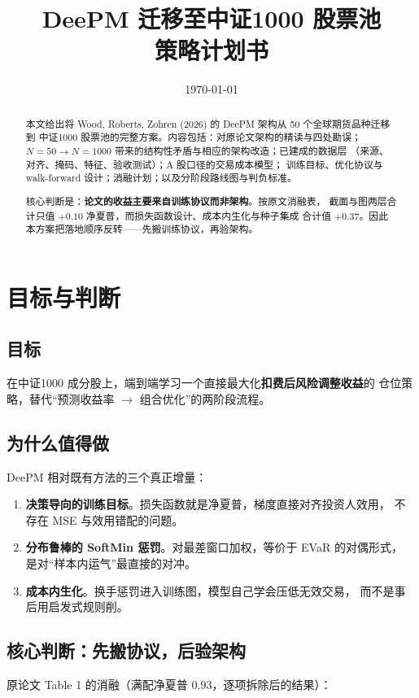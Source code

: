 \documentclass[11pt, a4paper]{ctexart}
\title{\bfseries DeePM 迁移至中证1000 股票池\\[4pt] \large 策略计划书}
\author{}
\date{\today}
\begin{document}
\maketitle
\thispagestyle{fancy}

\begin{abstract}
\noindent
本文给出将 Wood, Roberts, Zohren (2026) 的 DeePM 架构从 50 个全球期货品种迁移到
中证1000 股票池的完整方案。内容包括：对原论文架构的精读与四处勘误；
$N{=}50 \to N{=}1000$ 带来的结构性矛盾与相应的架构改造；已建成的数据层
（来源、对齐、掩码、特征、验收测试）；A 股口径的交易成本模型；
训练目标、优化协议与 walk-forward 设计；消融计划；以及分阶段路线图与判负标准。

核心判断是：\textbf{论文的收益主要来自训练协议而非架构}。按原文消融表，
截面与图两层合计只值 $+0.10$ 净夏普，而损失函数设计、成本内生化与种子集成
合计值 $+0.37$。因此本方案把落地顺序反转——先搬训练协议，再验架构。
\end{abstract}

\tableofcontents
\bigskip

\section{目标与判断}

\subsection{目标}
在中证1000 成分股上，端到端学习一个直接最大化\textbf{扣费后风险调整收益}的
仓位策略，替代“预测收益率 $\to$ 组合优化”的两阶段流程。

\subsection{为什么值得做}
DeePM 相对既有方法的三个真正增量：
\begin{enumerate}
  \item \textbf{决策导向的训练目标}。损失函数就是净夏普，梯度直接对齐投资人效用，
        不存在 MSE 与效用错配的问题。
  \item \textbf{分布鲁棒的 SoftMin 惩罚}。对最差窗口加权，等价于 EVaR 的对偶形式，
        是对“样本内运气”最直接的对冲。
  \item \textbf{成本内生化}。换手惩罚进入训练图，模型自己学会压低无效交易，
        而不是事后用启发式规则削。
\end{enumerate}

\subsection{核心判断：先搬协议，后验架构}
原论文 Table 1 的消融（满配净夏普 $0.93$，逐项拆除后的结果）：
\end{document}
